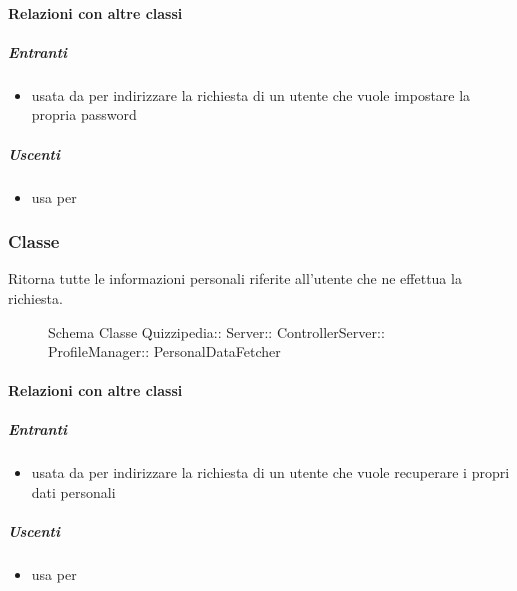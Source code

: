 \paragraph{Relazioni con altre classi}
\subparagraph{Entranti}
\begin{itemize}
\item usata da  per indirizzare la richiesta di un utente che vuole impostare la propria password
\end{itemize}
\subparagraph{Uscenti}
\begin{itemize}
\item usa  per 
\end{itemize}
\subsubsection{Classe }
Ritorna tutte le informazioni personali riferite all'utente che ne effettua la richiesta.
\begin{figure}[H]
\centering
\noindent{}
\caption[Schema Classe PersonalDataFetcher]{Schema Classe Quizzipedia:: Server:: ControllerServer:: ProfileManager:: PersonalDataFetcher}
\end{figure}
\paragraph{Relazioni con altre classi}
\subparagraph{Entranti}
\begin{itemize}
\item usata da  per indirizzare la richiesta di un utente che vuole recuperare i propri dati personali
\end{itemize}
\subparagraph{Uscenti}
\begin{itemize}
\item usa  per 
\end{itemize}
